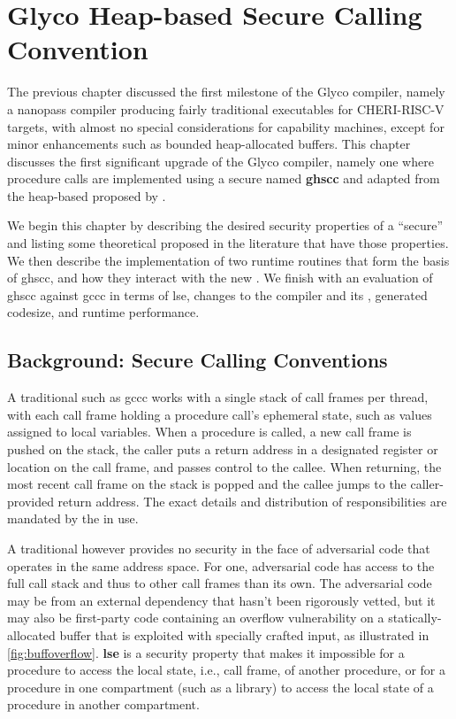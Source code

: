 \documentclass[main.tex]{subfiles}
\begin{document}
\onlyinsubfile{\mainmatter{}}

\chapter{Glyco Heap-based Secure Calling Convention}
The previous chapter discussed the first milestone of the Glyco compiler, namely a nanopass compiler producing fairly traditional executables for CHERI-RISC-V targets, with almost no special considerations for capability machines, except for minor enhancements such as bounded heap-allocated buffers. This chapter discusses the first significant upgrade of the Glyco compiler, namely one where procedure calls are implemented using a secure \cc{} named \textbf{\gls{ghscc}} and adapted from the heap-based \cc{} proposed by \cite{cerise}.

We begin this chapter by describing the desired security properties of a \enquote{secure} \cc{} and listing some theoretical \ccs{} proposed in the literature that have those properties. We then describe the implementation of two runtime routines that form the basis of \gls{ghscc}, and how they interact with the new \cc{}. We finish with an evaluation of \gls{ghscc} against \gls{gccc} in terms of \gls{lse}, changes to the compiler and its \ils{}, generated codesize, and runtime performance.

\section{Background: Secure Calling Conventions}
A traditional \cc{} such as \gls{gccc} works with a single stack of call frames per thread, with each call frame holding a procedure call's ephemeral state, such as values assigned to local variables. When a procedure is called, a new call frame is pushed on the stack, the caller puts a return address in a designated register or location on the call frame, and passes control to the callee. When returning, the most recent call frame on the stack is popped and the callee jumps to the caller-provided return address. The exact details and distribution of responsibilities are mandated by the \cc{} in use.

A traditional \cc{} however provides no security in the face of adversarial code that operates in the same address space. For one, adversarial code has access to the full call stack and thus to other call frames than its own. The adversarial code may be from an external dependency that hasn't been rigorously vetted, but it may also be first-party code containing an overflow vulnerability on a statically-allocated buffer that is exploited with specially crafted input, as illustrated in \cref{fig:buffoverflow}. \textbf{\Gls{lse}} is a security property that makes it impossible for a procedure to access the local state, i.e., call frame, of another procedure, or for a procedure in one compartment (such as a library) to access the local state of a procedure in another compartment.
\end{document}
